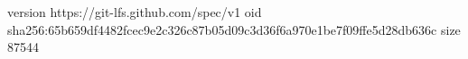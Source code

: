 version https://git-lfs.github.com/spec/v1
oid sha256:65b659df4482fcec9e2c326c87b05d09c3d36f6a970e1be7f09ffe5d28db636c
size 87544
